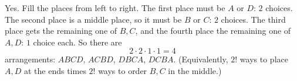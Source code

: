 Yes. Fill the places from left to right. The first place must be $A$ or $D$: $2$ choices. The second place is a middle place, so it must be $B$ or $C$: $2$ choices. The third place gets the remaining one of $B,C$, and the fourth place the remaining one of $A,D$: $1$ choice each. So there are
\[2\cdot2\cdot1\cdot1=\boxed{4}\]
arrangements: $ABCD$, $ACBD$, $DBCA$, $DCBA$. (Equivalently, $2!$ ways to place $A,D$ at the ends times $2!$ ways to order $B,C$ in the middle.)
